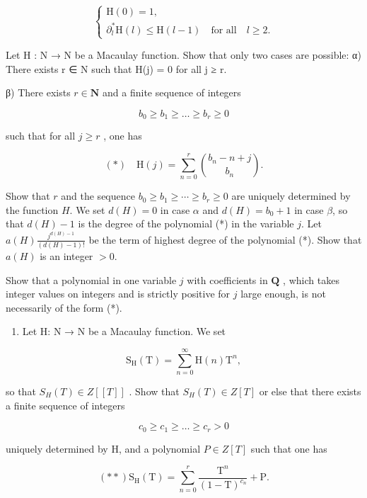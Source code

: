 \[
\left\{ \begin{array}{l} \mathrm{H} (0) = 1, \\ \partial_ {l} ^ {*} \mathrm{H} (l) \leqslant \mathrm{H} (l - 1) \quad \text {for all} \quad l \geqslant 2. \end{array} \right.
\]

Let H : N → N be a Macaulay function. Show that only two cases are possible: α) There exists r ∈ N such that H(j) = 0 for all j ≥ r.

β) There exists \(r \in \mathbf{N}\) and a finite sequence of integers

\[
b _ {0} \geqslant b _ {1} \geqslant \dots \geqslant b _ {r} \geqslant 0
\]

such that for all \(j \geqslant r\) , one has

\[
(*) \quad \mathrm{H} (j) = \sum_ {n = 0} ^ {r} \binom {b _ {n} - n + j} {b _ {n}}.
\]

Show that \(r\) and the sequence \(b_0 \geqslant b_1 \geqslant \cdots \geqslant b_r \geqslant 0\) are uniquely determined by the function \(H\). We set \(d(H) = 0\) in case \(\alpha\) and \(d(H) = b_0 + 1\) in case \(\beta\), so that \(d(H) - 1\) is the degree of the polynomial (*) in the variable \(j\). Let \(a(H) \frac{j^{d(H)-1}}{(d(H) - 1)!}\) be the term of highest degree of the polynomial (*). Show that \(a(H)\) is an integer \(> 0\).

Show that a polynomial in one variable \(j\) with coefficients in \(\mathbf{Q}\) , which takes integer values on integers and is strictly positive for \(j\) large enough, is not necessarily of the form (*).

\begin{enumerate}
\def\labelenumi{\alph{enumi})}
\setcounter{enumi}{2}
\tightlist
\item
  Let H: N → N be a Macaulay function. We set
\end{enumerate}

\[
\mathrm{S} _ {\mathrm{H}} (\mathrm{T}) = \sum_ {n = 0} ^ {\infty} \mathrm{H} (n) \mathrm{T} ^ {n},
\]

so that \(S_{H}(T) \in Z[[T]]\) . Show that \(S_{H}(T) \in Z[T]\) or else that there exists a finite sequence of integers

\[
c _ {0} \geqslant c _ {1} \geqslant \dots \geqslant c _ {r} > 0
\]

uniquely determined by H, and a polynomial \(P \in Z[T]\) such that one has

\[
(* *) \mathrm{S} _ {\mathrm{H}} (\mathrm{T}) = \sum_ {n = 0} ^ {r} \frac {\mathrm{T} ^ {n}}{(1 - \mathrm{T}) ^ {c _ {n}}} + \mathrm{P}.
\]


